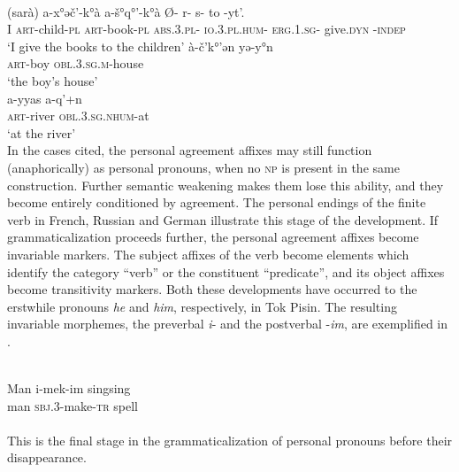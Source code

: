 \ea\label{ex:E10}
\langinfo{\LangAbkh}{}{} \\
 \ea
 \gll (sarà)  a-x°əč'-k°à                  a-š°q°'-k°à                          Ø- r- s- to -yt'.\\
I            \textsc{art}-child-\textsc{pl}  \textsc{art}-book-\textsc{pl}  \textsc{abs}.3.\textsc{pl}- \textsc{io}.3.\textsc{pl}.\textsc{hum}- \textsc{erg}.1.\textsc{sg}- give.\textsc{dyn} -\textsc{indep}\\
\glt ‘I give the books to the children’
\ex 
\gll à-č'k°'ən  yə-y°n\\
 \textsc{art}-boy  \textsc{obl}.3.\textsc{sg.m}-house\\
\glt ‘the boy's house’\\
\ex
\gll a-yyas  a-q'+n\\
 \textsc{art}-river  \textsc{obl}.3.\textsc{sg}.\textsc{nhum}-at\\
\glt ‘at the river’\\
\z
\z
\noindent In the cases cited, the personal agreement affixes may still function (anaphorically) as personal pronouns, when no \textsc{np} is present in the same construction. Further semantic weakening makes them lose this ability, and they become entirely conditioned by agreement. The personal endings of the finite verb in French, Russian and German illustrate this stage of the development. If grammaticalization proceeds further, the personal agreement affixes become invariable markers. The subject affixes of the verb become elements which identify the category ``verb'' or the constituent ``predicate'', and its object affixes become transitivity markers. Both these developments have occurred to the erstwhile pronouns \textit{he} and \textit{him}, respectively, in Tok Pisin. The resulting invariable morphemes, the preverbal \textit{i}{}- and the postverbal -\textit{im}, are exemplified in .

\ea\label{ex:E11}
 \\
\gll  Man  i-mek-im  singsing\\
man  \textsc{sbj}.3-make-\textsc{tr}  spell\\
 \\
\z
\noindent This is the final stage in the grammaticalization of personal pronouns before their disappearance.


